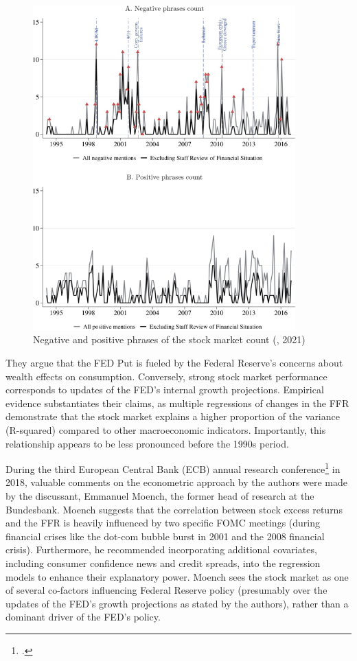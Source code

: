 \begin{figure}[h]
    \centering
        \label{cies21_fig5}
    \includegraphics[width=0.9\textwidth]{figures/cies21/Figure5}
    \caption{Negative and positive phrases of the stock market count (\cite{cieslak_economics_2021}, 2021)}
\end{figure}

They argue that the FED Put is fueled by the Federal Reserve's concerns about wealth effects on consumption. Conversely, strong stock market performance corresponds to updates of the FED’s internal growth projections. Empirical evidence substantiates their claims, as multiple regressions of changes in the FFR demonstrate that the stock market explains a higher proportion of the variance (R-squared) compared to other macroeconomic indicators. Importantly, this relationship appears to be less pronounced before the 1990s period.  

During the third European Central Bank (ECB) annual research conference\footcite{european_central_bank_third_2018} in 2018, valuable comments on the econometric approach by the authors were made by the discussant, Emmanuel Moench, the former head of research at the Bundesbank. Moench suggests that the correlation between stock excess returns and the FFR is heavily influenced by two specific FOMC meetings (during financial crises like the dot-com bubble burst in 2001 and the 2008 financial crisis). Furthermore, he recommended incorporating additional covariates, including consumer confidence news and credit spreads, into the regression models to enhance their explanatory power. Moench sees the stock market as one of several co-factors influencing Federal Reserve policy (presumably over the updates of the FED's growth projections as stated by the authors), rather than a dominant driver of the FED's policy.

